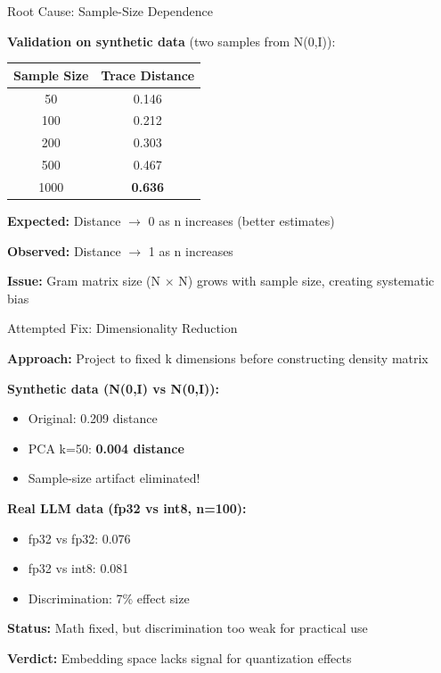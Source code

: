 \documentclass[aspectratio=169,11pt]{beamer}
\newcommand{\good}{\textcolor{darkgreen}{\ding{51}}}
\newcommand{\bad}{\textcolor{darkred}{\ding{55}}}
\begin{document}
\begin{frame}{Root Cause: Sample-Size Dependence}

\textbf{Validation on synthetic data} (two samples from N(0,I)):

\vspace{0.5em}

\begin{center}
\begin{tabular}{cc}
\toprule
\textbf{Sample Size} & \textbf{Trace Distance} \\
\midrule
50 & 0.146 \\
100 & 0.212 \\
200 & 0.303 \\
500 & 0.467 \\
1000 & \textbf{0.636} \\
\bottomrule
\end{tabular}
\end{center}

\vspace{0.5em}

\textbf{Expected:} Distance $\to$ 0 as n increases (better estimates)

\textbf{Observed:} Distance $\to$ 1 as n increases \bad

\vspace{0.5em}

\textbf{Issue:} Gram matrix size (N $\times$ N) grows with sample size, creating systematic bias

\end{frame}

\begin{frame}{Attempted Fix: Dimensionality Reduction}

\textbf{Approach:} Project to fixed k dimensions before constructing density matrix

\vspace{0.5em}

\textbf{Synthetic data (N(0,I) vs N(0,I)):}
\begin{itemize}
  \item Original: 0.209 distance \bad
  \item PCA k=50: \textbf{0.004 distance} \good
  \item Sample-size artifact eliminated! \good
\end{itemize}

\vspace{0.5em}

\textbf{Real LLM data (fp32 vs int8, n=100):}
\begin{itemize}
  \item fp32 vs fp32: 0.076
  \item fp32 vs int8: 0.081
  \item Discrimination: 7\% effect size
\end{itemize}

\vspace{0.5em}

\textbf{Status:} Math fixed, but discrimination too weak for practical use

\textbf{Verdict:} Embedding space lacks signal for quantization effects

\end{frame}
\end{document}
